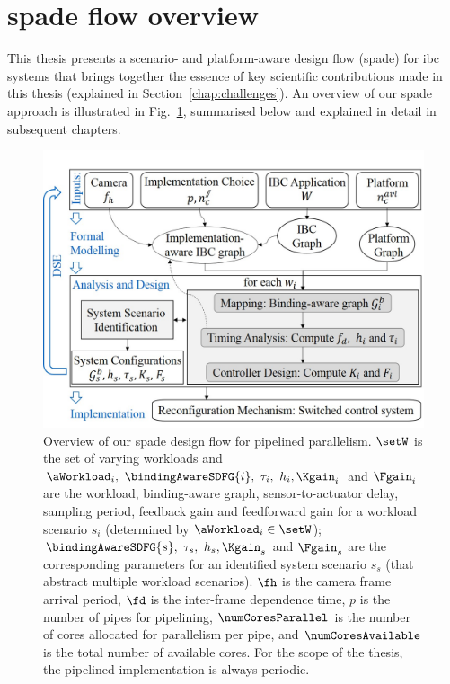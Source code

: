 \section{\texorpdfstring{\Gls{spade}}{SPADe} flow overview}
\label{chap:spadeoverview}
This thesis presents a scenario- and platform-aware design flow (\gls{spade}) for \gls{ibc} systems that brings together the essence of key scientific contributions made in this thesis (explained in Section~\ref{chap:challenges}).
An overview of our \gls{spade} approach is illustrated in Fig.~\ref{fig:ch1_spade_overview}, summarised below and explained in detail in subsequent chapters.

\begin{figure}[ht]
\centerline{\includegraphics[width=\textwidth]{01_intro/images/SPADeOverview5.jpg}}
\caption{Overview of our \gls{spade} design flow for pipelined parallelism. $\setW$ is the set of varying workloads and $\aWorkload_i,\ \bindingAwareSDFG{i},\ \tau_i,\ h_i, \Kgain_i$ and $\Fgain_i$ are the workload, binding-aware graph, sensor-to-actuator delay, sampling period, feedback gain and feedforward gain for a workload scenario $s_i$ (determined by $\aWorkload_i\in \setW$); 
$\bindingAwareSDFG{s},\ \tau_s,\ h_s, \Kgain_s$ and $\Fgain_s$ are the corresponding parameters for an identified system scenario $s_s$ (that abstract multiple workload scenarios). $\fh$ is the camera frame arrival period, $\fd$ is the inter-frame dependence time, $p$ is the number of pipes for pipelining, $\numCoresParallel$ is the number of cores allocated for parallelism per pipe, and $\numCoresAvailable$ is the total number of available cores. For the scope of the thesis, the pipelined implementation is always periodic.}
\label{fig:ch1_spade_overview}
\end{figure}
